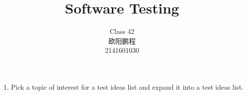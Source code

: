 \documentclass{article}
\title{Software Testing}
\author{Class 42 \\ 欧阳鹏程 \\ 2141601030}
\begin{document}
\maketitle
\begin{enumerate}
	\item Pick a topic of interest for a test ideas list and expand it into a test ideas list.
\end{enumerate}
\end{document}
